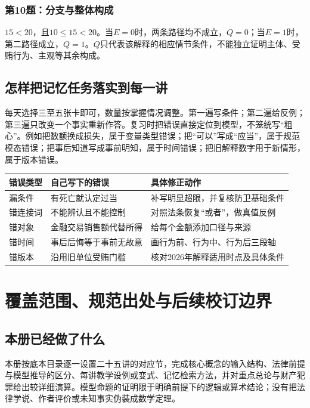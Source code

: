\subsection{第10题：分支与整体构成}
$15<20$，且$10\le15<20$。当$E=0$时，两条路径均不成立，$Q=0$；当$E=1$时，第二路径成立，$Q=1$。$Q$只代表该解释的相应情节条件，不能独立证明主体、受贿行为、主观等其余构成。

\section{怎样把记忆任务落实到每一讲}
每天选择三至五张卡即可，数量按掌握情况调整。第一遍写条件；第二遍给反例；第三遍只改变一个事实重新作答。复习时把错误直接定位到模型，不笼统写“粗心”。例如把数额换成损失，属于变量类型错误；把“可以”写成“应当”，属于规范模态错误；把事后知道写成事前明知，属于时间错误；把旧解释数字用于新情形，属于版本错误。

\begin{center}
\begin{tabular}{p{}p{}p{}}
\toprule
错误类型 & 自己写下的错误 & 具体修正动作\\\midrule
漏条件 & 有死亡就认定过当 & 补写明显超限，并复核防卫基础条件\\
错连接词 & 不能辨认且不能控制 & 对照法条恢复“或者”，做真值反例\\
错对象 & 金融交易销售额代替所得 & 给每个金额添加口径与来源\\
错时间 & 事后后悔等于事前无故意 & 画行为前、行为中、行为后三段轴\\
错版本 & 沿用旧单位受贿门槛 & 核对2026年解释适用时点及具体条件\\\bottomrule
\end{tabular}
\end{center}

\chapter{覆盖范围、规范出处与后续校订边界}

\section{本册已经做了什么}
本册按底本目录逐一设置二十五讲的对应节，完成核心概念的输入结构、法律前提与模型推导的区分、每讲教学设例或变式、记忆检索方法，并对重点总论与财产犯罪给出较详细演算。模型命题的证明限于明确前提下的逻辑或算术结论；没有把法律学说、作者评价或未知事实伪装成数学定理。

